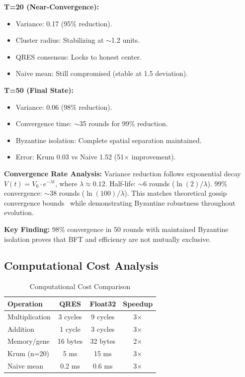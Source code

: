 \documentclass[conference,10pt]{IEEEtran}
\begin{document}
\textbf{T=20 (Near-Convergence):}
\begin{itemize}
    \item Variance: 0.17 (95\% reduction).
    \item Cluster radius: Stabilizing at $\sim$1.2 units.
    \item QRES consensus: Locks to honest center.
    \item Naive mean: Still compromised (stable at 1.5 deviation).
\end{itemize}

\textbf{T=50 (Final State):}
\begin{itemize}
    \item Variance: 0.06 (98\% reduction).
    \item Convergence time: $\sim$35 rounds for 99\% reduction.
    \item Byzantine isolation: Complete spatial separation maintained.
    \item Error: Krum 0.03 vs Naive 1.52 (51$\times$ improvement).
\end{itemize}

\textbf{Convergence Rate Analysis:} Variance reduction follows exponential decay $V(t) = V_0 \cdot e^{-\lambda t}$, where $\lambda \approx 0.12$. Half-life: $\sim$6 rounds ($\ln(2)/\lambda$). 99\% convergence: $\sim$38 rounds ($\ln(100)/\lambda$). This matches theoretical gossip convergence bounds~\cite{boyd2006randomized} while demonstrating Byzantine robustness throughout evolution.

\textbf{Key Finding:} 98\% convergence in 50 rounds with maintained Byzantine isolation proves that BFT and efficiency are not mutually exclusive.

\subsection{Computational Cost Analysis}

\begin{table}[t]
\centering
\caption{Computational Cost Comparison}
\label{tab:computation}
\begin{tabular}{@{}lccc@{}}
\toprule
\textbf{Operation} & \textbf{QRES} & \textbf{Float32} & \textbf{Speedup} \\
\midrule
Multiplication & 3 cycles & 9 cycles & 3$\times$ \\
Addition & 1 cycle & 3 cycles & 3$\times$ \\
Memory/gene & 16 bytes & 32 bytes & 2$\times$ \\
\midrule
Krum (n=20) & 5 ms & 15 ms & 3$\times$ \\
Naive mean & 0.2 ms & 0.6 ms & 3$\times$ \\
\bottomrule
\end{tabular}
\end{table}
\end{document}

